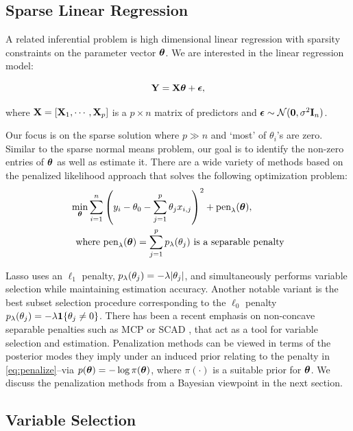 \documentclass[sts,preprint]{imsart}
\begin{document}

\subsection{Sparse Linear Regression} 

A related inferential problem is high dimensional linear regression with sparsity constraints on the parameter vector $\boldsymbol{\theta}$. We are interested in the linear regression model:

$$
{\bf Y} = {\bf X} \boldsymbol{\theta} + \boldsymbol{\epsilon},
$$

where ${\bf X} = [{\bf X}_1, \cdots, {\bf X}_p]$ is a $p \times n$ matrix of predictors and $\boldsymbol{\epsilon} \sim {\cal N}({\bf 0}, \sigma^2{\bf I}_n)$. 

Our focus is on the sparse solution where $p \gg n$ and `most' of $\theta_i$'s are zero. Similar to the
sparse normal means problem, our goal is to identify the non-zero entries of $\boldsymbol{\theta}$ as well as estimate it. There are a wide variety of methods based on the penalized likelihood approach that solves the following optimization problem:
\begin{align}
  \min_{\boldsymbol{\theta}} \sum_{i=1}^{n} &  \left( y_i - \theta_0 - \sum_{j=1}^{p} \theta_j x_{i,j} \right)^2 + \text{pen}_{\lambda}(\boldsymbol{\theta}), \label{eq:penalize} \\
  \text{where } & \text{pen}_{\lambda}(\boldsymbol{\theta}) = \sum_{j=1}^{p} p_{\lambda}(\theta_j) \text{ is a separable penalty} \nonumber
\end{align}

Lasso uses an $\ell_1$ penalty, $p_{\lambda}(\theta_j) = -\lambda \lvert\theta_j\rvert$, and simultaneously performs variable selection while maintaining estimation accuracy.  Another notable variant is the best subset selection procedure corresponding to the $\ell_0$ penalty $p_{\lambda}(\theta_j) = -\lambda {\bf 1}\{\theta_j \ne 0\}$.
There has been a recent emphasis on non-concave separable penalties such as MCP \citep{zhang2010nearly} or SCAD \citep{fan2001variable}, that act as a tool for variable selection and estimation. Penalization methods can be viewed in terms of the posterior modes they imply under an induced prior relating to the penalty in \eqref{eq:penalize}--via $p(\boldsymbol{\theta}) = -\log \pi(\boldsymbol{\theta})$, where $\pi(\cdot)$ is a suitable prior for $\boldsymbol{\theta}$. We discuss the penalization methods from a Bayesian viewpoint in the next section. 


\subsection{Variable Selection}
\end{document}
